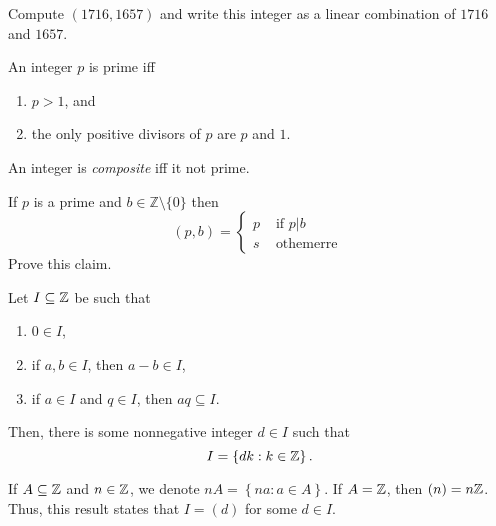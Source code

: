 \documentclass[11pt,a4paper]{article}
\begin{document}
\begin{teo}
    
\end{teo}


\begin{eje}
    Compute \((1716, 1657)\) and write this integer as a linear combination of \(1716\) and \(1657\).
\end{eje}

\begin{defi}
    An integer \(p\) is prime iff 
    \begin{enumerate}[label=(\roman*)]
        \item \(p>1\), and
        \item the only positive divisors of \(p\) are \(p\) and \(1\).
    \end{enumerate}
    An integer is \textit{composite} iff it not prime.
\end{defi}


\begin{rem}
    If $p$ is a prime and $b \in \mathbb{Z}\setminus \{0\}$ then
\[
(p, b)= \begin{cases}p & \text { if } p | b \\ s & \text { othemerre }\end{cases}
\]
Prove this claim.
\end{rem}

\begin{eje}
    Let \(I\subseteq \mathbb{Z}\) be such that 
    \begin{enumerate}[label=(\roman*)]
        \item \(0\in I\),
        \item if  \(a,b\in I\), then \(a-b\in I\), 
        \item if \(a\in I\) and \(q\in I\), then  \(aq\subseteq I\).
    \end{enumerate}
    Then, there is some nonnegative integer \(d\in I\) such that  \[I = \left\{ dk: k \in \mathbb{Z} \right\}.\]
\end{eje}

\begin{rem}
    If \(A\subseteq \mathbb{Z}\) and \(n\in \mathbb{Z}\), we denote 
    \(nA = \left\{n a : a\in A \right\}\).
    If \(A=\mathbb{Z}\), then \((n) = n\mathbb{Z}\).
    Thus, this result states that \(I=(d)\) for some \(d\in I\).
\end{rem}

\begin{sol}
    
\end{sol}
\end{document}
